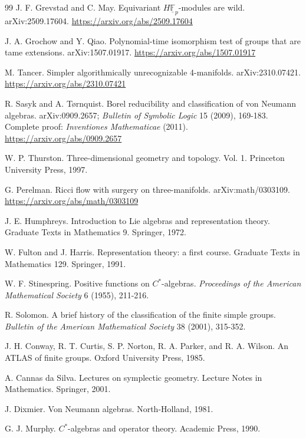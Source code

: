 \documentclass[11pt,letterpaper]{article}
\theoremstyle{definition}
\theoremstyle{remark}
\begin{document}
\begin{thebibliography}{99}
J. F. Grevstad and C. May. Equivariant $H\underline{\mathbb{F}}_p$-modules are wild. arXiv:2509.17604. \url{https://arxiv.org/abs/2509.17604}

J. A. Grochow and Y. Qiao. Polynomial-time isomorphism test of groups that are tame extensions. arXiv:1507.01917. \url{https://arxiv.org/abs/1507.01917}

M. Tancer. Simpler algorithmically unrecognizable 4-manifolds. arXiv:2310.07421. \url{https://arxiv.org/abs/2310.07421}

R. Sasyk and A. Tørnquist. Borel reducibility and classification of von Neumann algebras. arXiv:0909.2657; \emph{Bulletin of Symbolic Logic} 15 (2009), 169-183. Complete proof: \emph{Inventiones Mathematicae} (2011). \url{https://arxiv.org/abs/0909.2657}

W. P. Thurston. Three-dimensional geometry and topology. Vol. 1. Princeton University Press, 1997.

G. Perelman. Ricci flow with surgery on three-manifolds. arXiv:math/0303109. \url{https://arxiv.org/abs/math/0303109}

J. E. Humphreys. Introduction to Lie algebras and representation theory. Graduate Texts in Mathematics 9. Springer, 1972.

W. Fulton and J. Harris. Representation theory: a first course. Graduate Texts in Mathematics 129. Springer, 1991.

W. F. Stinespring. Positive functions on $C^*$-algebras. \emph{Proceedings of the American Mathematical Society} 6 (1955), 211-216.



R. Solomon. A brief history of the classification of the finite simple groups. \emph{Bulletin of the American Mathematical Society} 38 (2001), 315-352.

J. H. Conway, R. T. Curtis, S. P. Norton, R. A. Parker, and R. A. Wilson. An ATLAS of finite groups. Oxford University Press, 1985.



A. Cannas da Silva. Lectures on symplectic geometry. Lecture Notes in Mathematics. Springer, 2001.

J. Dixmier. Von Neumann algebras. North-Holland, 1981.

G. J. Murphy. $C^*$-algebras and operator theory. Academic Press, 1990.


\end{thebibliography}
\end{document}
